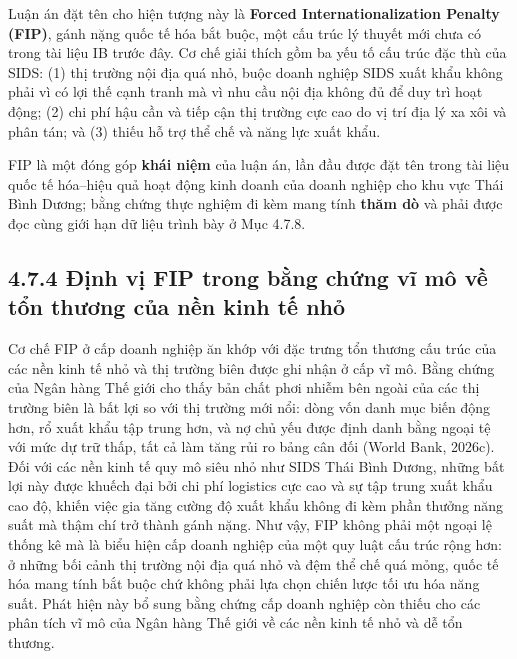 \documentclass[
  a4paper,
  13pt]{extreport}
\begin{document}
Luận án đặt tên cho hiện tượng này là \textbf{Forced
Internationalization Penalty (FIP)}, gánh nặng quốc tế hóa bắt buộc, một
cấu trúc lý thuyết mới chưa có trong tài liệu IB trước đây. Cơ chế giải
thích gồm ba yếu tố cấu trúc đặc thù của SIDS: (1) thị trường nội địa
quá nhỏ, buộc doanh nghiệp SIDS xuất khẩu không phải vì có lợi thế cạnh
tranh mà vì nhu cầu nội địa không đủ để duy trì hoạt động; (2) chi phí
hậu cần và tiếp cận thị trường cực cao do vị trí địa lý xa xôi và phân
tán; và (3) thiếu hỗ trợ thể chế và năng lực xuất khẩu.

FIP là một đóng góp \textbf{khái niệm} của luận án, lần đầu được đặt tên
trong tài liệu quốc tế hóa--hiệu quả hoạt động kinh doanh của doanh
nghiệp cho khu vực Thái Bình Dương; bằng chứng thực nghiệm đi kèm mang
tính \textbf{thăm dò} và phải được đọc cùng giới hạn dữ liệu trình bày ở
Mục 4.7.8.

\hypertarget{ux111ux1ecbnh-vux1ecb-fip-trong-bux1eb1ng-chux1ee9ng-vux129-muxf4-vux1ec1-tux1ed5n-thux1b0ux1a1ng-cux1ee7a-nux1ec1n-kinh-tux1ebf-nhux1ecf}{%
\subsection{4.7.4 Định vị FIP trong bằng chứng vĩ mô về tổn thương của
nền kinh tế
nhỏ}\label{ux111ux1ecbnh-vux1ecb-fip-trong-bux1eb1ng-chux1ee9ng-vux129-muxf4-vux1ec1-tux1ed5n-thux1b0ux1a1ng-cux1ee7a-nux1ec1n-kinh-tux1ebf-nhux1ecf}}

Cơ chế FIP ở cấp doanh nghiệp ăn khớp với đặc trưng tổn thương cấu trúc
của các nền kinh tế nhỏ và thị trường biên được ghi nhận ở cấp vĩ mô.
Bằng chứng của Ngân hàng Thế giới cho thấy bản chất phơi nhiễm bên ngoài
của các thị trường biên là bất lợi so với thị trường mới nổi: dòng vốn
danh mục biến động hơn, rổ xuất khẩu tập trung hơn, và nợ chủ yếu được
định danh bằng ngoại tệ với mức dự trữ thấp, tất cả làm tăng rủi ro bảng
cân đối (World Bank, 2026c). Đối với các nền kinh tế quy mô siêu nhỏ như
SIDS Thái Bình Dương, những bất lợi này được khuếch đại bởi chi phí
logistics cực cao và sự tập trung xuất khẩu cao độ, khiến việc gia tăng
cường độ xuất khẩu không đi kèm phần thưởng năng suất mà thậm chí trở
thành gánh nặng. Như vậy, FIP không phải một ngoại lệ thống kê mà là
biểu hiện cấp doanh nghiệp của một quy luật cấu trúc rộng hơn: ở những
bối cảnh thị trường nội địa quá nhỏ và đệm thể chế quá mỏng, quốc tế hóa
mang tính bắt buộc chứ không phải lựa chọn chiến lược tối ưu hóa năng
suất. Phát hiện này bổ sung bằng chứng cấp doanh nghiệp còn thiếu cho
các phân tích vĩ mô của Ngân hàng Thế giới về các nền kinh tế nhỏ và dễ
tổn thương.
\end{document}
